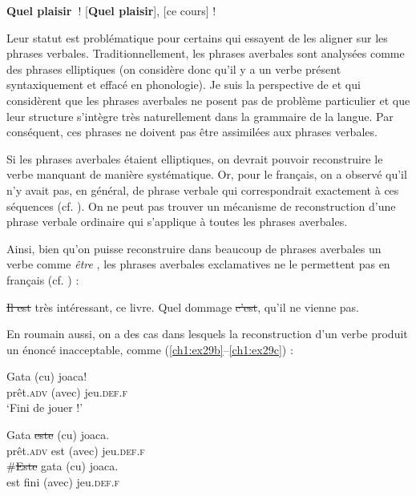 \ea
\ea
\textbf{Quel plaisir~}! \label{ch1:ex27a} 
\ex{}  [\textbf{Quel plaisir}], [ce cours] ! \label{ch1:ex27b}
\z
\z

Leur statut est problématique pour certains qui essayent de les aligner sur les phrases verbales. Traditionnellement, les phrases averbales sont analysées comme des phrases elliptiques (on considère donc qu’il y a un verbe présent syntaxiquement et effacé en phonologie). Je suis la perspective de \citet{Laurens2007,Laurens2008} et \citet{GGFToAppear} qui considèrent que les phrases averbales ne posent pas de problème particulier et que leur structure s’intègre très naturellement dans la grammaire de la langue. Par conséquent, ces phrases ne doivent pas être assimilées aux phrases verbales. 

Si les phrases averbales étaient elliptiques, on devrait pouvoir reconstruire le verbe manquant de manière systématique. Or, pour le français, on a observé qu’il n’y avait pas, en général, de phrase verbale qui correspondrait exactement à ces séquences (cf. \citealt{Laurens2007,Laurens2008,GGFToAppear}). On ne peut pas trouver un mécanisme de reconstruction d’une phrase verbale ordinaire qui s’applique à toutes les phrases averbales. 

Ainsi, bien qu’on puisse reconstruire dans beaucoup de phrases averbales un verbe comme \textit{être} , les phrases averbales exclamatives ne le permettent pas en français  (cf. \citealt{Laurens2008}) :

\ea
\ea  \st{Il est} très intéressant, ce livre. \label{ch1:ex28a} 
\ex  *Quel dommage \st{c’est}, qu’il ne vienne pas. \label{ch1:ex28b} 
\z
\z

En roumain aussi, on a des cas dans lesquels la reconstruction d’un verbe produit un énoncé inacceptable, comme (\ref{ch1:ex29b}--\ref{ch1:ex29c}) :

\ea
\ea
\gll   Gata  (cu)  joaca!\\
prêt\textsc{.adv}  (avec)  jeu\textsc{.def.f}  \\
\glt ‘Fini de jouer !’ 

\ex 
\gll  *Gata  \st{este}  (cu)  joaca. \label{ch1:ex29b}\\ 
  prêt\textsc{.adv}  est  (avec)  jeu\textsc{.def.f}\\

\ex
\gll  \#\st{Este}  gata  (cu)  joaca.{\rmfnm} \label{ch1:ex29c}\\ 
  est  fini  (avec)  jeu\textsc{.def.f}\\
\z
\z

